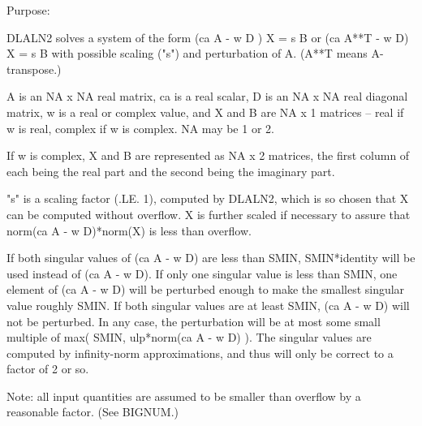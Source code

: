  \begin{DoxyParagraph}{Purpose\+: }
\begin{DoxyVerb} DLALN2 solves a system of the form  (ca A - w D ) X = s B
 or (ca A**T - w D) X = s B   with possible scaling ("s") and
 perturbation of A.  (A**T means A-transpose.)

 A is an NA x NA real matrix, ca is a real scalar, D is an NA x NA
 real diagonal matrix, w is a real or complex value, and X and B are
 NA x 1 matrices -- real if w is real, complex if w is complex.  NA
 may be 1 or 2.

 If w is complex, X and B are represented as NA x 2 matrices,
 the first column of each being the real part and the second
 being the imaginary part.

 "s" is a scaling factor (.LE. 1), computed by DLALN2, which is
 so chosen that X can be computed without overflow.  X is further
 scaled if necessary to assure that norm(ca A - w D)*norm(X) is less
 than overflow.

 If both singular values of (ca A - w D) are less than SMIN,
 SMIN*identity will be used instead of (ca A - w D).  If only one
 singular value is less than SMIN, one element of (ca A - w D) will be
 perturbed enough to make the smallest singular value roughly SMIN.
 If both singular values are at least SMIN, (ca A - w D) will not be
 perturbed.  In any case, the perturbation will be at most some small
 multiple of max( SMIN, ulp*norm(ca A - w D) ).  The singular values
 are computed by infinity-norm approximations, and thus will only be
 correct to a factor of 2 or so.

 Note: all input quantities are assumed to be smaller than overflow
 by a reasonable factor.  (See BIGNUM.)\end{DoxyVerb}
 
\end{DoxyParagraph}

